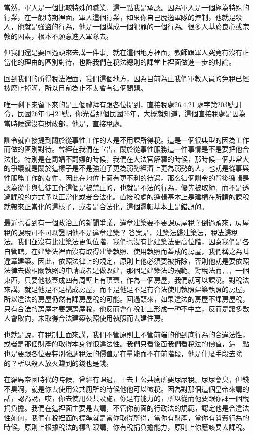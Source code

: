 \documentclass[]{ctexbook}
\begin{document}
當然，軍人是一個比較特殊的職業，這一點我是承認。因為軍人是一個極為特殊的行業，在一般時期裡面，軍人這個行業，如果你自己脫逸軍隊的控制，他就是殺人，他就是強盜的行為，他是一個構成一個犯罪的一個行為。很多人基於良心或宗教的因素，根本不願意進入軍隊去。

但我們還是要回過頭來去講一件事，就在這個地方裡面，教師跟軍人究竟有沒有正當化的理由的區別對待，也許我們在稅法總則的課堂上裡面做進一步的討論。

回到我們的所得稅法裡面，我們這個地方，因為目前為止我們軍教人員的免稅已經被廢止掉啊，所以目前為止不太會有這個問題。

唯一剩下來留下來的是上個禮拜有跟各位提到，直接稅處26.4.21.處字第203號訓令，民國26年4月21號，你光看那個民國26年，大概就知道，這個直接稅處是因為當時候還沒有財政部，他是，直接稅處。

訓令就直接提到關於從事性工作的人是不用課所得稅。這是一個很典型的因為工作而做的區別對待。曾經在我們在宣告，關於從事性服務這一件事情是不是要把他合法化，特別是在罰娼不罰嫖的時候，我們在大法官解釋的時候，那時候一個非常大的爭議就是關於這樣子是不是強迫了更為弱勢經濟上更為弱勢的人，也就是從事與性服務工作的女性，因此在地位上面有更不利的待遇。那么這個訓令的背後邏輯是認為從事與信徒工作這個是被禁止的，也就是不法的行為，優先被取締，而不是透過課稅的方式予以正當化或者合法化。直接稅處的邏輯基本上是建構在所謂的課稅就帶來正當化的這樣子，或者是合法化，這個邏輯基本上是錯誤的。

最近也看到有一個政治上的新聞爭議，違章建築要不要課房屋稅？倒過頭來，房屋稅的課稅可不可以證明他不是違章建築？ 答案是，建築法歸建築法，稅法歸稅法。我們並沒有比建築法更低位階，我們也沒有比建築法更高位階，因為我們是各自管轄。在建築法裡面沒有取得建築執照、使用執照而蓋成的房屋，我們稱之為叫違章建築。因此，依照法律上的規定，原則上他必須要被拆除，否則他就是要依照法律去做相關執照的申請或者是做改建，那個是建築法的規範。對稅法而言，一個東西，只要他被蓋成四有周壁上有頂蓋，作為一個房屋，我們就可以課稅。對稅法來講，就是他是不是構成房屋，而不是他是不是有合法使用執照建築執照的房屋，所以違法的房屋仍然有課房屋稅的可能。回過頭來，如果違法的房屋不課房屋稅，只有合法的房屋才要課房屋稅，他反而會在稅制上形成一種不中立，反而是讓多數人會取向，未取得合法建築執照使用執照而去建住房。

也就是說，在稅制上面來講，我們不管原則上不管前端的他到底行為的合違法性，或者是那個財產的取得本身得很違法性。我們只看後面我們看稅法的價值，這一點也是要跟各位要特別強調稅法的價值是在量能而不在前階段，他是什麼手段去除的？所以殺人放火賺到的錢也是錢。

在羅馬帝國時代的時候，曾經有課過，上去上公共廁所要尿尿稅。尿尿會臭，但錢不臭啊，就是你去使用公共廁所的時候他他可以徵稅。因為對那個這個皇帝來講的話，認為說，哎，你去使用公共設施，你是有能力的，所以從而他要跟你課一個稅捐負擔。我們在這裡面主要是去講，不管你前面的行政法的規範，認定他是合違法性如何，我們在稅裡面的標準就是當你取得所得，當你有財產，當你有消費行為的時候，原則上根據稅法的標準跟講，你有稅捐負擔能力，原則上你應該要去課稅。
\end{document}
